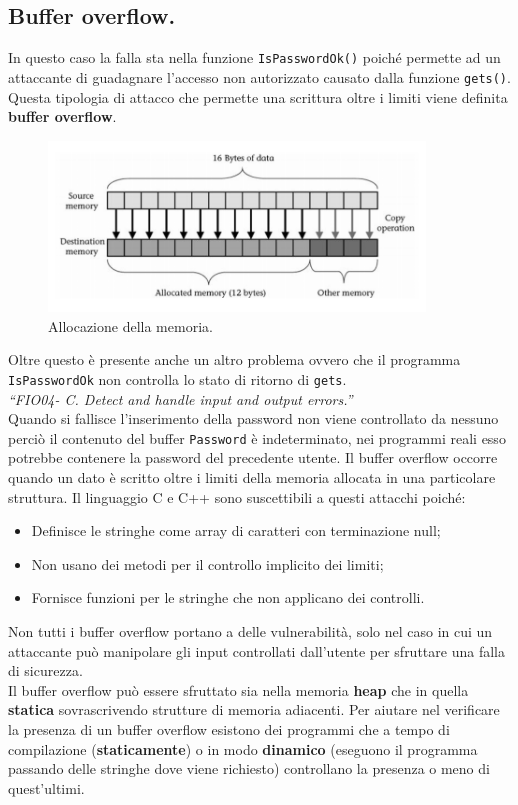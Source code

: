 \subsection{Buffer overflow.}

In questo caso la falla sta nella funzione \verb|IsPasswordOk()| poiché permette ad
un attaccante di guadagnare l'accesso non autorizzato causato dalla
funzione \verb|gets()|. Questa tipologia di attacco che permette una scrittura oltre
i limiti viene definita \textbf{buffer overflow}.

\begin{figure}[H]
    \centering
    \includegraphics[width=10cm, keepaspectratio]{capitoli/secure_coding/img/cap_2/memory.png}
    \caption{Allocazione della memoria.}\label{fig:memoria}
\end{figure}

Oltre questo è presente anche un altro problema ovvero che il
programma \verb|IsPasswordOk| non controlla lo stato di ritorno di \verb|gets|. \\
\textit{“FIO04- C. Detect and handle input and output errors.”}\\
Quando si fallisce l'inserimento della password non viene controllato da nessuno
perciò il contenuto del buffer \verb|Password| è indeterminato, nei programmi reali
esso potrebbe contenere la password del precedente utente.
Il buffer overflow occorre quando un dato è scritto oltre i limiti della memoria
allocata in una particolare struttura. Il linguaggio C e C++ sono
suscettibili a questi attacchi poiché:

\begin{itemize}
    \item Definisce le stringhe come array di caratteri con terminazione null;
    \item Non usano dei metodi per il controllo implicito dei limiti;
    \item Fornisce funzioni per le stringhe che non applicano dei controlli.
\end{itemize}

Non tutti i buffer overflow portano a delle vulnerabilità, solo nel caso in cui un
attaccante può manipolare gli input controllati dall'utente per sfruttare una
falla di sicurezza.\\
Il buffer overflow può essere sfruttato sia nella memoria \textbf{heap} che in
quella \textbf{statica} sovrascrivendo strutture di memoria adiacenti.
Per aiutare nel verificare la presenza di un buffer overflow esistono dei programmi
che a tempo di compilazione (\textbf{staticamente}) o in modo \textbf{dinamico}
(eseguono il programma passando delle stringhe dove viene richiesto) controllano la
presenza o meno di quest'ultimi.

